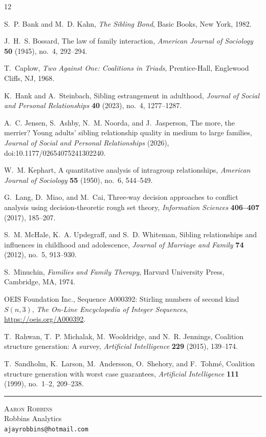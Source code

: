 \documentclass[11pt]{article}
\begin{document}
\begin{thebibliography}{12}

S.~P. Bank and M.~D. Kahn, \emph{The Sibling Bond}, Basic Books, New York, 1982.

J.~H.~S. Bossard, The law of family interaction, \emph{American Journal of
Sociology} \textbf{50} (1945), no.~4, 292--294.

T.~Caplow, \emph{Two Against One: Coalitions in Triads}, Prentice-Hall, Englewood
Cliffs, NJ, 1968.

K.~Hank and A.~Steinbach, Sibling estrangement in adulthood, \emph{Journal of Social
and Personal Relationships} \textbf{40} (2023), no.~4, 1277--1287.

A.~C. Jensen, S.~Ashby, N.~M. Noorda, and J.~Jasperson, The more, the merrier? Young
adults' sibling relationship quality in medium to large families, \emph{Journal of
Social and Personal Relationships} (2026), doi:10.1177/02654075241302240.

W.~M. Kephart, A quantitative analysis of intragroup relationships, \emph{American
Journal of Sociology} \textbf{55} (1950), no.~6, 544--549.

G.~Lang, D.~Miao, and M.~Cai, Three-way decision approaches to conflict analysis
using decision-theoretic rough set theory, \emph{Information Sciences}
\textbf{406--407} (2017), 185--207.

S.~M. McHale, K.~A. Updegraff, and S.~D. Whiteman, Sibling relationships and
influences in childhood and adolescence, \emph{Journal of Marriage and Family}
\textbf{74} (2012), no.~5, 913--930.

S.~Minuchin, \emph{Families and Family Therapy}, Harvard University Press, Cambridge,
MA, 1974.

OEIS Foundation Inc., Sequence A000392: Stirling numbers of second kind $S(n,3)$,
\emph{The On-Line Encyclopedia of Integer Sequences}, \url{https://oeis.org/A000392}.

T.~Rahwan, T.~P. Michalak, M.~Wooldridge, and N.~R. Jennings, Coalition structure
generation: A survey, \emph{Artificial Intelligence} \textbf{229} (2015), 139--174.

T.~Sandholm, K.~Larson, M.~Andersson, O.~Shehory, and F.~Tohm\'e, Coalition structure
generation with worst case guarantees, \emph{Artificial Intelligence} \textbf{111}
(1999), no.~1--2, 209--238.

\end{thebibliography}

\bigskip
\noindent\rule{0.3\textwidth}{0.4pt}

\medskip
\noindent
\textsc{Aaron Robbins} \\
Robbins Analytics \\
\texttt{ajayrobbins@hotmail.com}
\end{document}

